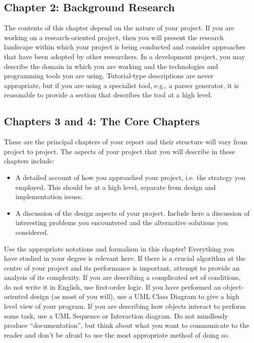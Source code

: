\documentclass[]{final_report}
\begin{document}
\subsection{Chapter 2: Background Research}

The contents of this chapter depend on the nature of your project. If you are working on a research-oriented project, then you will present the research landscape within which your project is being conducted and consider approaches that have been adopted by other researchers. In a development project, you may describe the domain in which you are working and the technologies and programming tools you are using. Tutorial-type descriptions are never appropriate, but if you are using a specialist tool, e.g., a parser generator, it is reasonable to provide a section that describes the tool at a high level.


\subsection{Chapters 3 and 4: The Core Chapters}

These are the principal chapters of your report and their structure will vary from project to project. The aspects of your project that you will describe in these chapters include:

\begin{itemize}
\item A detailed account of how you approached your project, i.e. the strategy you employed. This should be at a high level, separate from design and implementation issues.
\item A discussion of the design aspects of your project. Include here a discussion of interesting problems you encountered and the alternative solutions you considered.
\end{itemize}

Use the appropriate notations and formalism in this chapter! Everything you have studied in your degree is relevant here. If there is a crucial algorithm at the centre of your project and its performance is important, attempt to provide an analysis of its complexity. If you are describing a complicated set of conditions, do not write it in English, use first-order logic. If you have performed an object-oriented design (as most of you will), use a UML Class Diagram to give a high level view of your program. If you are describing how objects interact to perform some task, use a UML Sequence or Interaction diagram. Do not mindlessly produce ``documentation'', but think about what you want to communicate to the reader and don't be afraid to use the most appropriate method of doing so.
\end{document}
